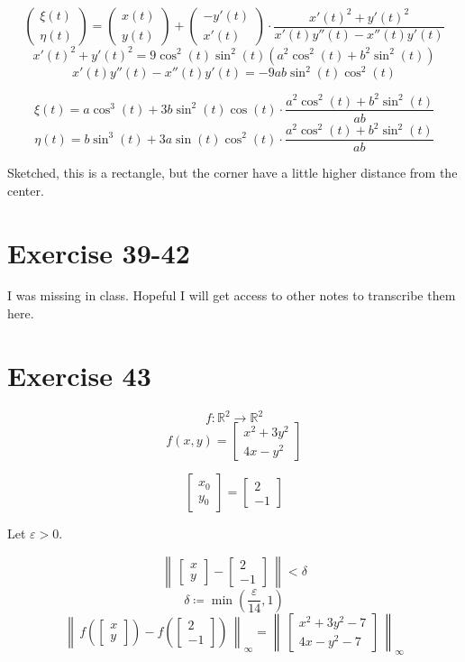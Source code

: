\documentclass[a4paper]{article}
\theoremstyle{definition}
\newcommand\norm[1]{\left\|\,#1\,\right\|}
\begin{document}
\[ \begin{pmatrix} \xi(t) \\ \eta(t) \end{pmatrix}
= \begin{pmatrix} x(t) \\ y(t) \end{pmatrix} + \begin{pmatrix} -y'(t) \\ x'(t) \end{pmatrix} \cdot \frac{x'(t)^2 + y'(t)^2}{x'(t) y''(t) - x''(t) y'(t)} \]
\[ x'(t)^2 + y'(t)^2 = 9\cos^2(t) \sin^2(t) (a^2 \cos^2(t) + b^2 \sin^2(t)) \]
\[ x'(t) y''(t) - x''(t) y'(t) = -9ab\sin^2(t) \cos^2(t) \]

\[ \xi(t) = a \cos^3(t) + 3b \sin^2(t) \cos(t) \cdot \frac{a^2 \cos^2(t) + b^2 \sin^2(t)}{ab} \]
\[ \eta(t) = b\sin^3(t) + 3a \sin(t) \cos^2(t) \cdot \frac{a^2 \cos^2(t) + b^2 \sin^2(t)}{ab} \]

Sketched, this is a rectangle, but the corner have a little higher distance from the center.

\section{Exercise 39-42}

I was missing in class. Hopeful I will get access to other notes to transcribe them here.

\section{Exercise 43}

\[ f: \mathbb R^2 \to \mathbb R^2 \]
\[ f(x,y) = \begin{bmatrix} x^2 + 3y^2 \\ 4x - y^2 \end{bmatrix} \]

\[ \begin{bmatrix} x_0 \\ y_0 \end{bmatrix} = \begin{bmatrix} 2 \\ -1 \end{bmatrix} \]

Let $\varepsilon > 0$.

\[ \norm{\begin{bmatrix} x \\ y \end{bmatrix} - \begin{bmatrix} 2 \\ -1 \end{bmatrix}} < \delta \]
\[ \delta \coloneqq \min\left(\frac\varepsilon{14}, 1\right) \]
\[ \norm{f(\begin{bmatrix} x \\ y \end{bmatrix}) - f(\begin{bmatrix} 2 \\ -1 \end{bmatrix})}_\infty = \norm{\begin{bmatrix} x^2 + 3y^2 - 7 \\ 4x - y^2 - 7 \end{bmatrix}}_\infty \]
\end{document}

